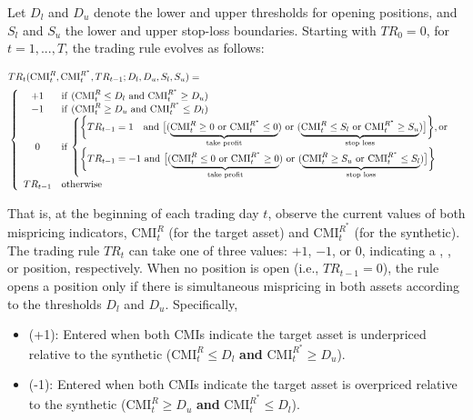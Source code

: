 Let $D_l$ and $D_u$ denote the lower and upper thresholds for opening positions, and $S_l$ and $S_u$ the lower and upper stop-loss boundaries. Starting with $TR_0=0$, for $t=1,...,T$, the trading rule evolves as follows:

\begin{align}\label{eq:trading_rule}
&TR_t(\t{CMI}_t^R, \t{CMI}_t^{R^*}, TR_{t-1}; D_l, D_u, S_l, S_u) 
=
\\[0.2em]
&\mycases{clllll}{
+1 & \IF ~  
(\t{CMI}_t^R \leq  D_l 
~\t{and}~ 
\t{CMI}_t^{R^*} \geq D_u)
\\
-1 & \IF ~ 
(\t{CMI}_t^R \geq D_u 
~\t{and}~ 
\t{CMI}_t^{R^*} \leq D_l)
\\
0 & \IF~
$$
\begin{cases}
\biggl\{
TR_{t-1}=1 
~~~\t{and}~ 
\bigl[
(\ub{\t{CMI}_t^R\geq 0 ~\t{or}~ \t{CMI}_t^{R^*}\leq 0}{\t{take profit}})
~\t{or}~
(\ub{\t{CMI}_t^R\leq S_l ~\t{or}~ \t{CMI}_t^{R^*}\geq S_u}{\t{stop loss}})
\bigr]
\biggr\}
,\t{or}
\\
\biggl\{
TR_{t-1}=-1 
~\t{and}~ 
\bigl[
(\ub{\t{CMI}_t^R\leq 0 ~\t{or}~ \t{CMI}_t^{R^*}\geq 0}{\t{take profit}})
~\t{or}~
(\ub{\t{CMI}_t^R\geq S_u ~\t{or}~ \t{CMI}_t^{R^*}\leq S_l}{\t{stop loss}})
\bigr]
\biggr\}
\end{cases}
$$
\\
TR_{t-1} & \t{otherwise}
}
\end{align}

That is, at the beginning of each trading day \(t\), observe the current values of both mispricing indicators, \(\mathrm{CMI}_t^R\) (for the target asset) and \(\mathrm{CMI}_t^{R^*}\) (for the synthetic). The trading rule \(TR_t\) can take one of three values: \(+1\), \(-1\), or \(0\), indicating a , , or  position, respectively. When no position is open (i.e., \(TR_{t-1} = 0\)), the rule opens a position only if there is simultaneous mispricing in both assets according to the thresholds \(D_l\) and \(D_u\). 
Specifically,
\begin{itemize}
  \item {} (+1): Entered when both CMIs indicate the target asset is underpriced relative to the synthetic ($\text{CMI}_t^R \leq D_l$ \textbf{and} $\text{CMI}_t^{R^*} \geq D_u$).
  \item {} (-1): Entered when both CMIs indicate the target asset is overpriced relative to the synthetic ($\text{CMI}_t^R \geq D_u$ \textbf{and} $\text{CMI}_t^{R^*} \leq D_l$).
\end{itemize} 

